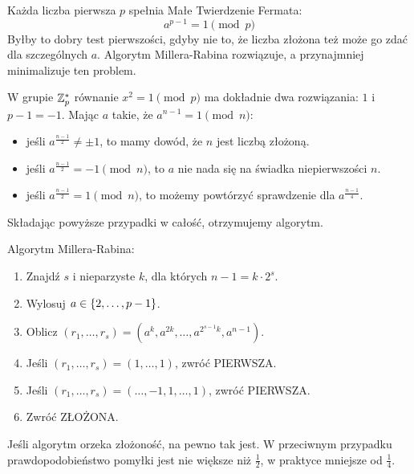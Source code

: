 Każda liczba pierwsza \( p \) spełnia Małe Twierdzenie Fermata: \[ a^{p-1} = 1 \pmod{p} \] Byłby to dobry test pierwszości, gdyby nie to, że liczba złożona też może go zdać dla szczególnych \( a \). Algorytm Millera-Rabina rozwiązuje, a przynajmniej minimalizuje ten problem.

W grupie \( \mathbb{Z}_p^{*} \) równanie \( x^2 = 1 \pmod{p} \) ma dokładnie dwa rozwiązania: \( 1 \) i \( p - 1 = -1 \).
Mając \( a \) takie, że \( a^{n-1} = 1 \pmod{n} \):
\begin{itemize}
	\item jeśli \( a^{\frac{n-1}{2}} \neq \pm 1 \), to mamy dowód, że \( n \) jest liczbą złożoną.
	\item jeśli \( a^{\frac{n-1}{2}} = -1 \pmod{n} \), to \( a \) nie nada się na świadka niepierwszości \( n \).
	\item jeśli \( a^{\frac{n-1}{2}} = 1 \pmod{n} \), to możemy powtórzyć sprawdzenie dla \( a^{\frac{n-1}{4}}\).
\end{itemize}
Składając powyższe przypadki w całość, otrzymujemy algorytm.
\begin{greyframe}
	Algorytm Millera-Rabina:
	\begin{enumerate}
		\item Znajdź \( s \) i nieparzyste \( k \), dla których \( n-1 = k \cdot 2^s \).
		\item Wylosuj \( a \in \set{2, \dots, p - 1} \).
		\item Oblicz \( (r_1, \dots, r_s ) = (a^k, a^{2k}, \dots, a^{2^{s-1}k}, a^{n-1}) \).
		\item Jeśli \( (r_1, \dots, r_s) = (1, \dots, 1) \), zwróć PIERWSZA.
		\item Jeśli \( (r_1, \dots, r_s) = (\dots, -1, 1, \dots, 1) \), zwróć PIERWSZA.
		\item Zwróć ZŁOŻONA.
	\end{enumerate}
\end{greyframe}
Jeśli algorytm orzeka złożoność, na pewno tak jest. W przeciwnym przypadku prawdopodobieństwo pomyłki jest nie większe niż \( \frac{1}{2} \), w praktyce mniejsze od \( \frac{1}{4} \).

